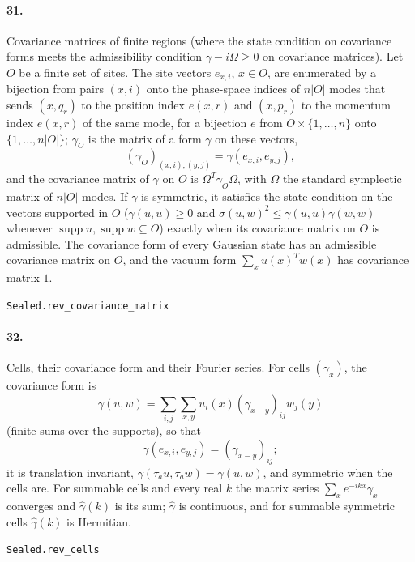 \documentclass[11pt]{article}
\begin{document}
\paragraph{31.} Covariance matrices of finite regions (where the state condition on covariance forms meets the admissibility condition $\gamma - i\Omega \ge 0$ on covariance matrices). Let $O$ be a finite set of sites. The site vectors $e_{x,i}$, $x \in O$, are enumerated by a bijection from pairs $(x, i)$ onto the phase-space indices of $n|O|$ modes that sends $(x, q_r)$ to the position index $e(x, r)$ and $(x, p_r)$ to the momentum index $e(x, r)$ of the same mode, for a bijection $e$ from $O \times \{1, \dots, n\}$ onto $\{1, \dots, n|O|\}$; $\gamma_O$ is the matrix of a form $\gamma$ on these vectors, \[(\gamma_O)_{(x,i),(y,j)} = \gamma(e_{x,i}, e_{y,j}),\] and the covariance matrix of $\gamma$ on $O$ is $\Omega^T \gamma_O \Omega$, with $\Omega$ the standard symplectic matrix of $n|O|$ modes. If $\gamma$ is symmetric, it satisfies the state condition on the vectors supported in $O$ ($\gamma(u, u) \ge 0$ and $\sigma(u, w)^2 \le \gamma(u, u) \gamma(w, w)$ whenever $\operatorname{supp} u, \operatorname{supp} w \subseteq O$) exactly when its covariance matrix on $O$ is admissible. The covariance form of every Gaussian state has an admissible covariance matrix on $O$, and the vacuum form $\sum_x u(x)^T w(x)$ has covariance matrix $1$.\par{\footnotesize\texttt{Sealed.rev\_covariance\_matrix}}

\paragraph{32.} Cells, their covariance form and their Fourier series. For cells $(\gamma_x)$, the covariance form is \[\gamma(u, w) = \sum_{i, j} \sum_{x, y} u_i(x) (\gamma_{x-y})_{ij} w_j(y)\] (finite sums over the supports), so that \[\gamma(e_{x,i}, e_{y,j}) = (\gamma_{x-y})_{ij};\] it is translation invariant, $\gamma(\tau_a u, \tau_a w) = \gamma(u, w)$, and symmetric when the cells are. For summable cells and every real $k$ the matrix series $\sum_x e^{-ikx} \gamma_x$ converges and $\hat\gamma(k)$ is its sum; $\hat\gamma$ is continuous, and for summable symmetric cells $\hat\gamma(k)$ is Hermitian.\par{\footnotesize\texttt{Sealed.rev\_cells}}
\end{document}
